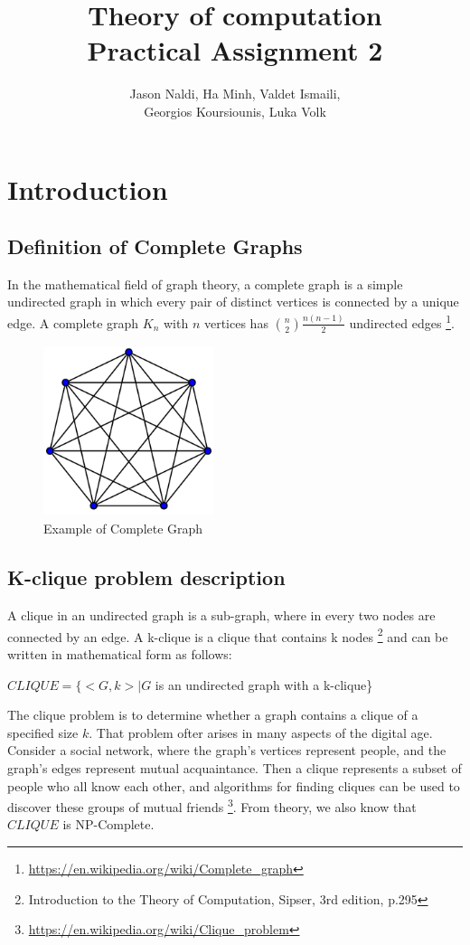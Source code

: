 \documentclass[12pt]{article}
\title{Theory of computation\\ Practical Assignment 2}
\author{Jason Naldi, Ha Minh, Valdet Ismaili,\\ Georgios Koursiounis, Luka Volk}
\begin{document}
\maketitle

\section{Introduction}
\subsection{Definition of Complete Graphs}

In the mathematical field of graph theory, a complete graph is a simple undirected graph in which every pair of distinct vertices is connected by a unique edge. A complete graph $K_n$ with $n$ vertices has $\binom{n}{2}\frac{n(n-1)}{2}$ undirected edges \footnote{\url{https://en.wikipedia.org/wiki/Complete\_graph}}.

\begin{figure}[ht!]
    \centering
    \includegraphics[width=5cm, height=5cm]{Complete_graph.png}
    \caption{Example of Complete Graph}
\end{figure}

\subsection{K-clique problem description}

A clique in an undirected graph is a sub-graph, where in every two nodes are connected by an edge. A k-clique is a clique that contains k nodes
\footnote{Introduction to the Theory of Computation, Sipser, 3rd edition, p.295}
and can be written in mathematical form as follows:

\begin{center}
$CLIQUE = \{<G, k> | G$ is an undirected graph with a k-clique\}
\end{center}

The clique problem is to determine whether a graph contains a clique of a specified size $k$. That problem ofter arises in many aspects of the digital age. Consider a social network, where the graph's vertices represent people, and the graph's edges represent mutual acquaintance. Then a clique represents a subset of people who all know each other, and algorithms for finding cliques can be used to discover these groups of mutual friends
\footnote{\url{https://en.wikipedia.org/wiki/Clique\_problem}}. From theory, we also know that $CLIQUE$ is NP-Complete.
\end{document}

